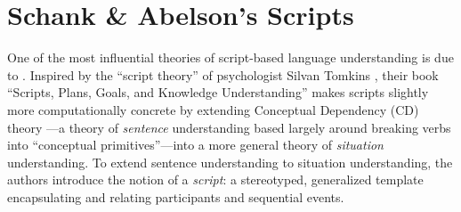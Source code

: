\section{Schank \& Abelson's Scripts}
\label{sec:schank}


One of the most influential theories of script-based language understanding is due to \citet{schankandabelson}. Inspired by the ``script theory'' of psychologist Silvan Tomkins \citep{tomkins1978script}, their book ``Scripts, Plans, Goals, and Knowledge Understanding'' makes scripts slightly more computationally concrete by extending Conceptual Dependency (CD) theory \citep{schank1969conceptual}---a theory of \textit{sentence} understanding based largely around breaking verbs into ``conceptual primitives''---into a more general theory of \textit{situation} understanding. To extend sentence understanding to situation understanding, the authors introduce the notion of a \textit{script}: a stereotyped, generalized template encapsulating and relating participants and sequential events.



%

